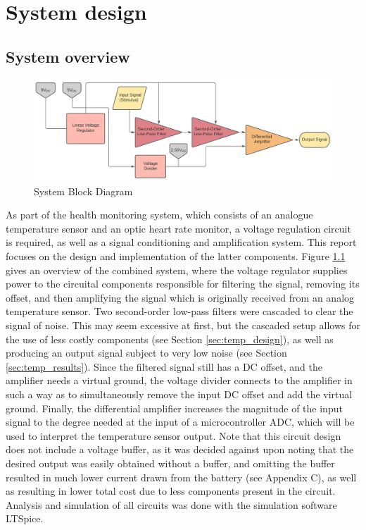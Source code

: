 
\chapter{System design}
	\section{System overview} \label{sec:system}

\begin{figure}[h]
    \centering
    \includegraphics[width = 1\textwidth]{Figures/1.1_block}
    \caption{System Block Diagram}
    \label{fig:1.1_block}
\end{figure}

As part of the health monitoring system, which consists of an analogue temperature sensor and an optic heart rate monitor, a voltage regulation circuit is required, as well as a signal conditioning and amplification system. This report focuses on the design and implementation of the latter components. Figure \ref{fig:1.1_block} gives an overview of the combined system, where the voltage regulator supplies power to the circuital components responsible for filtering the signal, removing its offset, and then amplifying the signal which is originally received from an analog temperature sensor. Two second-order low-pass filters were cascaded to clear the signal of noise. This may seem excessive at first, but the cascaded setup allows for the use of less costly components (see Section \ref{sec:temp_design}), as well as producing an output signal subject to very low noise (see Section \ref{sec:temp_results}). Since the filtered signal still has a DC offset, and the amplifier needs a virtual ground, the voltage divider connects to the amplifier in such a way as to simultaneously remove the input DC offset and add the virtual ground. Finally, the differential amplifier increases the magnitude of the input signal to the degree needed at the input of a microcontroller ADC, which will be used to interpret the temperature sensor output. Note that this circuit design does not include a voltage buffer, as it was decided against upon noting that the desired output was easily obtained without a buffer, and omitting the buffer resulted in much lower current drawn from the battery (see Appendix C), as well as resulting in lower total cost due to less components present in the circuit. Analysis and simulation of all circuits was done with the simulation software LTSpice.

\vfill









